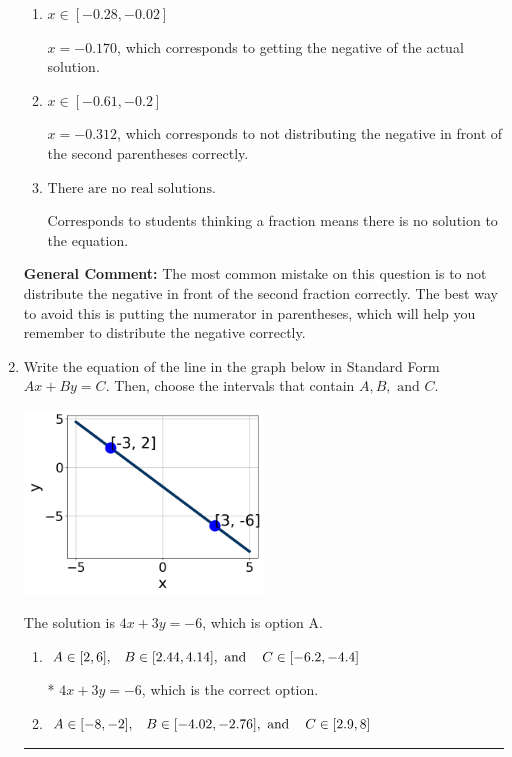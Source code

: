 \documentclass{extbook}[14pt]
\newcommand{\litem}[1]{\item #1

\rule{\textwidth}{0.4pt}}
\begin{document}
\begin{enumerate}
{\begin{enumerate}[label=\Alph*.]
$x = 0.312$, which corresponds to not distributing the negative in front of the first parentheses correctly.
\item \( x \in [-0.28, -0.02] \)

$x = -0.170$, which corresponds to getting the negative of the actual solution.
\item \( x \in [-0.61, -0.2] \)

$x = -0.312$, which corresponds to not distributing the negative in front of the second parentheses correctly.
\item \( \text{There are no real solutions.} \)

Corresponds to students thinking a fraction means there is no solution to the equation.
\end{enumerate}

\textbf{General Comment:} The most common mistake on this question is to not distribute the negative in front of the second fraction correctly. The best way to avoid this is putting the numerator in parentheses, which will help you remember to distribute the negative correctly.
}
\litem{
Write the equation of the line in the graph below in Standard Form $Ax+By=C$. Then, choose the intervals that contain $A, B, \text{ and } C$.

\begin{center}
    \includegraphics[width=0.5\textwidth]{../Figures/linearGraphToStandardCopyA.png}
\end{center}


The solution is \( 4x + 3y = -6 \), which is option A.\begin{enumerate}[label=\Alph*.]
\item \( A \in [2, 6], \hspace{3mm} B \in [2.44, 4.14], \text{ and } \hspace{3mm} C \in [-6.2, -4.4] \)

* $4x + 3y = -6$, which is the correct option.
\item \( A \in [-8, -2], \hspace{3mm} B \in [-4.02, -2.76], \text{ and } \hspace{3mm} C \in [2.9, 8] \)


\end{enumerate}}
\end{enumerate}
\end{document}
